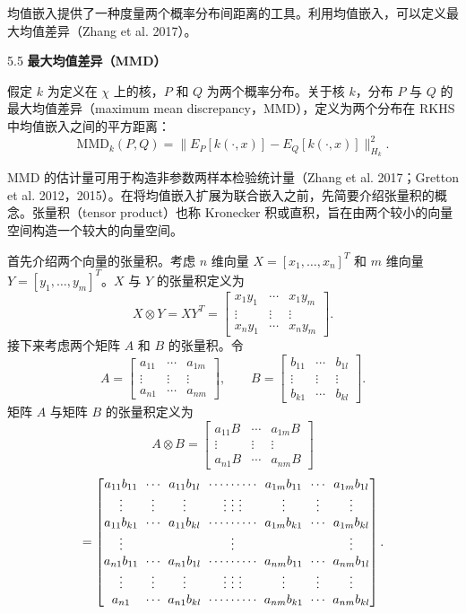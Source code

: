 均值嵌入提供了一种度量两个概率分布间距离的工具。利用均值嵌入，可以定义最大均值差异（Zhang et al. 2017）。

\begin{bookdefinition}{5.5}
\textbf{最大均值差异（MMD）}

假定 $k$ 为定义在 $\chi$ 上的核，$P$ 和 $Q$ 为两个概率分布。关于核 $k$，分布 $P$ 与 $Q$ 的最大均值差异（maximum mean discrepancy，MMD），定义为两个分布在 RKHS 中均值嵌入之间的平方距离：
\begin{equation}
\mathrm{MMD}_k(P,Q)=\lVert E_P[k(\cdot,x)]-E_Q[k(\cdot,x)]\rVert_{H_k}^2.
\tag{5.24}
\end{equation}
\end{bookdefinition}

MMD 的估计量可用于构造非参数两样本检验统计量（Zhang et al. 2017；Gretton et al. 2012，2015）。在将均值嵌入扩展为联合嵌入之前，先简要介绍张量积的概念。张量积（tensor product）也称 Kronecker 积或直积，旨在由两个较小的向量空间构造一个较大的向量空间。

首先介绍两个向量的张量积。考虑 $n$ 维向量 $X=[x_1,\ldots,x_n]^T$ 和 $m$ 维向量 $Y=[y_1,\ldots,y_m]^T$。$X$ 与 $Y$ 的张量积定义为
\[
X\otimes Y=XY^T=\begin{bmatrix}
x_1y_1&\cdots&x_1y_m\\
\vdots&\vdots&\vdots\\
x_ny_1&\cdots&x_ny_m
\end{bmatrix}.
\]
接下来考虑两个矩阵 $A$ 和 $B$ 的张量积。令
\[
A=\begin{bmatrix}a_{11}&\cdots&a_{1m}\\\vdots&\vdots&\vdots\\a_{n1}&\cdots&a_{nm}\end{bmatrix},\qquad
B=\begin{bmatrix}b_{11}&\cdots&b_{1l}\\\vdots&\vdots&\vdots\\b_{k1}&\cdots&b_{kl}\end{bmatrix}.
\]
矩阵 $A$ 与矩阵 $B$ 的张量积定义为
\[
A\otimes B=\begin{bmatrix}a_{11}B&\cdots&a_{1m}B\\\vdots&\vdots&\vdots\\a_{n1}B&\cdots&a_{nm}B\end{bmatrix}
\]
\[
\begingroup\setlength{\arraycolsep}{3pt}
=\begin{bmatrix}
a_{11}b_{11}&\cdots&a_{11}b_{1l}&\cdots\cdots\cdots&a_{1m}b_{11}&\cdots&a_{1m}b_{1l}\\
\vdots&\vdots&\vdots&\vdots\ \vdots\ \vdots&\vdots&\vdots&\vdots\\
a_{11}b_{k1}&\cdots&a_{11}b_{kl}&\cdots\cdots\cdots&a_{1m}b_{k1}&\cdots&a_{1m}b_{kl}\\
\vdots&&&\vdots&&&\vdots\\
a_{n1}b_{11}&\cdots&a_{n1}b_{1l}&\cdots\cdots\cdots&a_{nm}b_{11}&\cdots&a_{nm}b_{1l}\\
\vdots&\vdots&\vdots&\vdots\ \vdots\ \vdots&\vdots&\vdots&\vdots\\
a_{n1}&\cdots&a_{n1}b_{kl}&\cdots\cdots\cdots&a_{nm}b_{k1}&\cdots&a_{nm}b_{kl}
\end{bmatrix}.
\endgroup
\]

